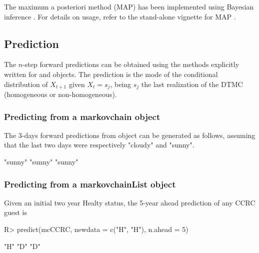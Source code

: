 \documentclass[nojss]{jss}
\begin{document}
The maximum a posteriori method (MAP) has been implemented using Bayesian inference \citep{sch}. For details on usage, refer to the stand-alone vignette for MAP \citep{MAPmcR}.

\subsection{Prediction}


The $n$-step forward predictions can be obtained using the  methods
explicitly written for  and  objects. 
The prediction is the mode of the conditional distribution of $X_{t+1}$ given
$X_{t}=s_{j}$, being $s_{j}$ the last realization of the DTMC (homogeneous
or non-homogeneous).

\subsubsection{Predicting from a markovchain object}

The 3-days forward predictions from  object can be generated as follows, assuming that the last two days were respectively "cloudy" and "sunny".

\begin{Schunk}
\begin{Soutput}
[1] "sunny" "sunny" "sunny"
\end{Soutput}
\end{Schunk}

\subsubsection{Predicting from a markovchainList object}

Given an initial two year Healty status, the 5-year ahead prediction of any
CCRC guest is

\begin{Schunk}
\begin{Sinput}
R> predict(mcCCRC, newdata = c("H", "H"), n.ahead = 5)
\end{Sinput}
\begin{Soutput}
[1] "H" "D" "D"
\end{Soutput}
\end{Schunk}
\end{document}
